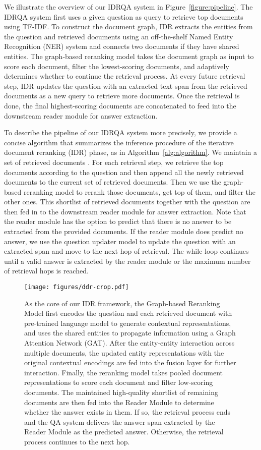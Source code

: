 \documentclass[sigconf]{acmart}
\begin{document}
We illustrate the overview of our IDRQA system in Figure~\ref{figure:pipeline}. The IDRQA system first uses a given question as query to retrieve top  documents using TF-IDF. To construct the document graph,
IDR extracts the entities from the question and retrieved documents using an off-the-shelf Named Entity Recognition (NER) system and connects two documents if they have shared entities.
The graph-based reranking model takes the document graph as input to score each document, filter the lowest-scoring documents, and adaptively determines whether to continue the retrieval process. At every future retrieval step, IDR updates the question with an extracted text span from the retrieved documents as a new query to retrieve more documents.
Once the retrieval is done, the final highest-scoring documents are concatenated to feed into the downstream reader module \citep{devlin-etal-2019-bert,Lan2020ALBERT:} for answer extraction.


To describe the pipeline of our IDRQA system more precisely, we provide a concise algorithm that summarizes the inference procedure of the iterative document reranking (IDR) phase, as in Algorithm~\ref{alg:algorithm}. We maintain a set of retrieved documents . For each retrieval step, we retrieve the top  documents according to the question  and then append all the newly retrieved documents to the current set of retrieved documents. Then we use the graph-based reranking model  to rerank those documents, get top  of them, and filter the other ones. This shortlist of retrieved documents together with the question  are then fed in to the downstream reader module  for answer extraction. Note that the reader module has the option to predict that there is no answer to be extracted from the provided documents. If the reader module does predict no answer, we use the question updater model  to update the question with an extracted span and move to the next hop of retrieval. The while loop continues until a valid answer is extracted by the reader module or the maximum number of retrieval hops  is reached.




\begin{figure*}[ht]
\center
\texttt{[image: figures/ddr-crop.pdf]}
\center
\caption{As the core of our IDR framework, the Graph-based Reranking Model first encodes the question and each retrieved document with pre-trained language model to generate contextual representations, and uses the shared entities to propagate information using a Graph Attention Network (GAT). After the entity-entity interaction across multiple documents, the updated entity representations with the original contextual encodings are fed into the fusion layer for further interaction. Finally, the reranking model takes pooled document representations to score each document and filter low-scoring documents. The maintained high-quality shortlist of remaining documents are then fed into the Reader Module to determine whether the answer exists in them. If so, the retrieval process ends and the QA system delivers the answer span extracted by the Reader Module as the predicted answer. Otherwise, the retrieval process continues to the next hop.}
\label{figure:IDR}
\end{figure*}
\end{document}
